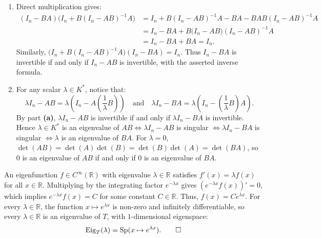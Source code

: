\begin{exercisesolution}
\label{sol:resolvent_identity_matrix_products}
\begin{enumerate}[label=\textbf{(\alph*)}]
    \item Direct multiplication gives:
    \begin{align*}
    (I_n - BA)\big(I_n + B(I_n - AB)^{-1}A\big) &= I_n + B(I_n - AB)^{-1}A - BA - BAB(I_n - AB)^{-1}A \\
    &= I_n - BA + B\big(I_n - AB\big)(I_n - AB)^{-1}A \\
    &= I_n - BA + BA = I_n.
    \end{align*}
    Similarly, $\big(I_n + B(I_n - AB)^{-1}A\big)(I_n - BA) = I_n$.
    Thus $I_n - BA$ is invertible if and only if $I_n - AB$ is invertible, with the asserted inverse formula.

    \item For any scalar $\lambda \in K^*$, notice that:
    \[
    \lambda I_n - AB = \lambda\left(I_n - A\left(\frac{1}{\lambda}B\right)\right) \quad \text{and} \quad \lambda I_n - BA = \lambda\left(I_n - \left(\frac{1}{\lambda}B\right)A\right).
    \]
    By part \textbf{(a)}, $\lambda I_n - AB$ is invertible if and only if $\lambda I_n - BA$ is invertible.
    Hence $\lambda \in K^*$ is an eigenvalue of $AB \iff \lambda I_n - AB$ is singular $\iff \lambda I_n - BA$ is singular $\iff \lambda$ is an eigenvalue of $BA$.
    For $\lambda = 0$, $\det(AB) = \det(A)\det(B) = \det(B)\det(A) = \det(BA)$, so $0$ is an eigenvalue of $AB$ if and only if $0$ is an eigenvalue of $BA$. \qedhere
\end{enumerate}
\end{exercisesolution}

\begin{exercisesolution*}
\label{sol:eigenfunctions_derivative_operator}
An eigenfunction $f \in C^\infty(\mathbb{R})$ with eigenvalue $\lambda \in \mathbb{R}$ satisfies $f'(x) = \lambda f(x)$ for all $x \in \mathbb{R}$.
Multiplying by the integrating factor $e^{-\lambda x}$ gives $(e^{-\lambda x} f(x))' = 0$, which implies $e^{-\lambda x} f(x) = C$ for some constant $C \in \mathbb{R}$.
Thus, $f(x) = C e^{\lambda x}$.
For every $\lambda \in \mathbb{R}$, the function $x \mapsto e^{\lambda x}$ is non-zero and infinitely differentiable, so every $\lambda \in \mathbb{R}$ is an eigenvalue of $T$, with $1$-dimensional eigenspace:
\[
\operatorname{Eig}_T(\lambda) = \operatorname{Sp}(x \mapsto e^{\lambda x}). \qedhere
\]
\end{exercisesolution*}

